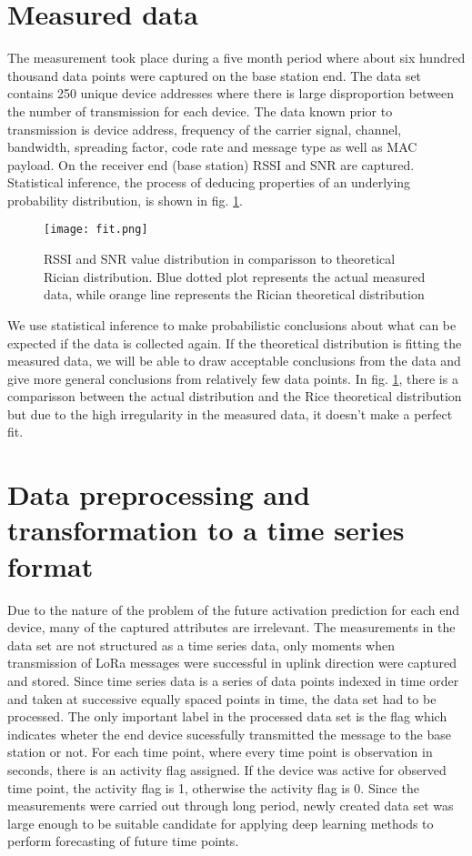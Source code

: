\section{Measured data}
The measurement took place during a five month period where about six hundred thousand data points were captured on the base station end.
The data set contains 250 unique device addresses where there is large disproportion between the number of transmission for each device. 
The data known prior to transmission is device address, frequency of the carrier signal, channel, bandwidth, spreading factor, code rate and message type as well as MAC payload.
On the receiver end (base station) RSSI and SNR are captured.
Statistical inference, the process of deducing properties of an underlying probability distribution, is shown in fig. \ref{fig:fit}. 
\begin{figure}[h]
    \centering
    \texttt{[image: fit.png]}
    \caption{RSSI and SNR value distribution in comparisson to theoretical Rician distribution. Blue dotted plot represents the actual measured data, while orange line represents the Rician theoretical distribution}
    \label{fig:fit}
\end{figure}
We use statistical inference to make probabilistic conclusions about what can be expected if the data is collected again.
If the theoretical distribution is fitting the measured data, we will be able to draw acceptable conclusions from the data and give more general conclusions from relatively few data points.
In fig. \ref{fig:fit}, there is a comparisson between the actual distribution and the Rice theoretical distribution but due to the high irregularity in the measured data, it doesn't make a perfect fit.


\section{Data preprocessing and transformation to a time series format}
Due to the nature of the problem of the future activation prediction for each end device, many of the captured attributes are irrelevant.
The measurements in the data set are not structured as a time series data, only moments when transmission of LoRa messages were successful in uplink direction were captured and stored.
Since time series data is a series of data points indexed in time order and taken at successive equally spaced points in time, the data set had to be processed.
The only important label in the processed data set is the flag which indicates wheter the end device sucessfully transmitted the message to the base station or not.
For each time point, where every time point is observation in seconds, there is an activity flag assigned.
If the device was active for observed time point, the activity flag is 1, otherwise the activity flag is 0.
Since the measurements were carried out through long period, newly created data set was large enough to be suitable candidate for applying deep learning methods to perform forecasting of future time points.

